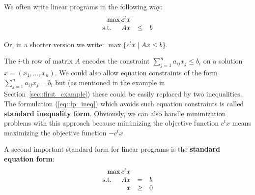 \documentclass[12pt, showidx, twoside]{article}
\newcommand{\BLUE}[1]{\textcolor{blue}{#1}}
\newcommand{\GREEN}[1]{\textcolor{mygreen}{#1}}
\def\hi{\bf}
\begin{document}
We often write linear programs in the following way:
\begin{equation} \label{eq::lp_ineq}
\begin{array}{rcl}
\max c^t x & & \\
 \mbox{s.t. \quad} Ax & \leq & b
\end{array}
\end{equation}


Or, in a shorter version we write: $\max\{c^t x \mid Ax \leq b \}$.

The $i$-th row of
matrix $A$ encodes the constraint
${\sum_{j=1}^n a_{ij} x_j \leq b_i}$ on a solution
$x = (x_1,\dots,x_n)$. We could also allow equation constraints
of the form ${\sum_{j=1}^n a_{ij} x_j = b_i}$ but
(as mentioned in the example in Section~\ref{sec::first_example})
these could be easily replaced by two
inequalities. The formulation (\ref{eq::lp_ineq}) which avoids
such equation constraints is called 
{\hi standard inequality form}.{}
Obviously, we can also handle minimization problems with this 
approach because minimizing the objective function $c^t x$ means
maximizing the objective function $-c^t x$.









A second important standard form for linear programs is the 
{\hi standard equation form}: {}
\begin{equation} \label{eq::lp_eq}
\begin{array}{rcl}
 \max c^t x & & \\
 \mbox{s.t. \quad} Ax & = & b\\
 x & \geq & 0
\end{array}
\end{equation}
\end{document}
